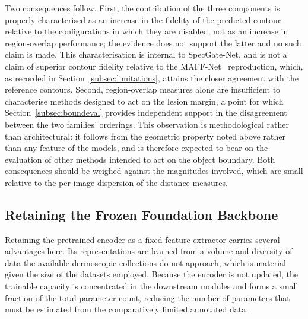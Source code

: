 Two consequences follow. First, the contribution of the three components is properly characterised as an increase in the fidelity of the predicted contour relative to the configurations in which they are disabled, not as an increase in region-overlap performance; the evidence does not support the latter and no such claim is made. This characterisation is internal to SpecGate-Net, and is not a claim of superior contour fidelity relative to the MAFF-Net~\cite{ref15} reproduction, which, as recorded in Section~\ref{subsec:limitations}, attains the closer agreement with the reference contours. Second, region-overlap measures alone are insufficient to characterise methods designed to act on the lesion margin, a point for which Section~\ref{subsec:boundeval} provides independent support in the disagreement between the two families' orderings. This observation is methodological rather than architectural: it follows from the geometric property noted above rather than any feature of the models, and is therefore expected to bear on the evaluation of other methods intended to act on the object boundary. Both consequences should be weighed against the magnitudes involved, which are small relative to the per-image dispersion of the distance measures.

\subsection{Retaining the Frozen Foundation Backbone}

Retaining the pretrained encoder as a fixed feature extractor carries several advantages here. Its representations are learned from a volume and diversity of data the available dermoscopic collections do not approach, which is material given the size of the datasets employed. Because the encoder is not updated, the trainable capacity is concentrated in the downstream modules and forms a small fraction of the total parameter count, reducing the number of parameters that must be estimated from the comparatively limited annotated data.

